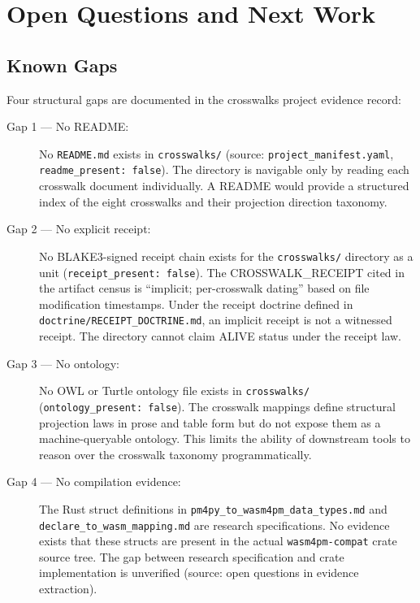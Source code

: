 
\section{Open Questions and Next Work}
\label{sec:crosswalks-openq}

\subsection{Known Gaps}
\label{sec:crosswalks-openq-gaps}

Four structural gaps are documented in the crosswalks project evidence record:

\begin{description}
  \item[Gap 1 --- No README:] No \texttt{README.md} exists in \texttt{crosswalks/} (source:
        \texttt{project\_manifest.yaml}, \texttt{readme\_present: false}). The directory is
        navigable only by reading each crosswalk document individually. A README would provide
        a structured index of the eight crosswalks and their projection direction taxonomy.

  \item[Gap 2 --- No explicit receipt:] No \textsc{BLAKE3}-signed receipt chain exists for
        the \texttt{crosswalks/} directory as a unit (\texttt{receipt\_present: false}).
        The \textsc{CROSSWALK\_RECEIPT} cited in the artifact census is ``implicit; per-crosswalk
        dating'' based on file modification timestamps. Under the receipt doctrine defined in
        \texttt{doctrine/RECEIPT\_DOCTRINE.md}, an implicit receipt is not a witnessed receipt.
        The directory cannot claim \textsc{ALIVE} status under the receipt law.

  \item[Gap 3 --- No ontology:] No \textsc{OWL} or Turtle ontology file exists in
        \texttt{crosswalks/} (\texttt{ontology\_present: false}). The crosswalk mappings define
        structural projection laws in prose and table form but do not expose them as a
        machine-queryable ontology. This limits the ability of downstream tools to reason over
        the crosswalk taxonomy programmatically.

  \item[Gap 4 --- No compilation evidence:] The Rust struct definitions in
        \texttt{pm4py\_to\_wasm4pm\_data\_types.md} and \texttt{declare\_to\_wasm\_mapping.md}
        are research specifications. No evidence exists that these structs are present in the
        actual \texttt{wasm4pm-compat} crate source tree. The gap between research specification
        and crate implementation is unverified (source: open questions in evidence extraction).
\end{description}

